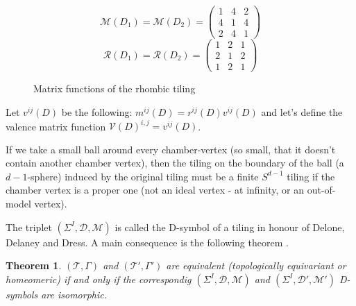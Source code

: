 \documentclass[12pt,a4paper]{article}
\numberwithin{equation}{section}
\theoremstyle{plain}%
\newtheorem{thm}{Theorem}[section]
\theoremstyle{definition}
\theoremstyle{remark}
\begin{document}
\begin{figure}
  \caption{\label{fig:rhombic_mx} Matrix functions of the rhombic tiling}
  \begin{equation*}
    \mathcal{M}(D_1)=\mathcal{M}(D_2)=
    \left(
    \begin{array}{cccc}
      1 & 4 & 2\\
      4 & 1 & 4\\
      2 & 4 & 1
    \end{array}
    \right)
  \end{equation*}
  \begin{equation*}
    \mathcal{R}(D_1)=\mathcal{R}(D_2)=
    \left(
    \begin{array}{cccc}
      1 & 2 & 1\\
      2 & 1 & 2\\
      1 & 2 & 1
    \end{array}
    \right)
  \end{equation*}
\end{figure}

Let $v^{ij}(D)$ be the following: $m^{ij}(D)=r^{ij}(D)v^{ij}(D)$ and
let's define the valence matrix function
$\mathcal{V}(D)^{i,j}=v^{ij}(D)$.


If we take a small ball around every chamber-vertex (so small, that it doesn't
contain another chamber vertex), then the tiling on the boundary of the ball (a
$d-1$-sphere)
induced by the original tiling must be a finite $S^{d-1}$ tiling \cite{D87} if the
chamber vertex is a proper one (not an ideal vertex - at infinity, or an
out-of-model vertex).

The triplet $(\Sigma^I,\mathcal{D},\mathcal{M})$ is called the D-symbol of a
tiling in honour of Delone, Delaney and Dress. A main consequence is the
following theorem \cite{D87}.
\begin{thm}
$(\mathcal{T},\Gamma)$ and
$(\mathcal{T}',\Gamma')$ are equivalent (topologically equivariant or homeomeric)
if and only if the correspondig $(\Sigma^I,\mathcal{D},\mathcal{M})$ and
$(\Sigma^I,\mathcal{D}',\mathcal{M}')$ D-symbols are isomorphic.
\end{thm}
\end{document}
